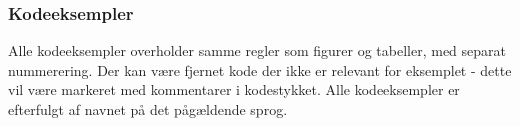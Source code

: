 \subsubsection*{Kodeeksempler}
Alle kodeeksempler overholder samme regler som figurer og tabeller, med separat nummerering. Der kan være fjernet kode der ikke er relevant for eksemplet - dette vil være markeret med kommentarer i kodestykket. Alle kodeeksempler er efterfulgt af navnet på det pågældende sprog.


